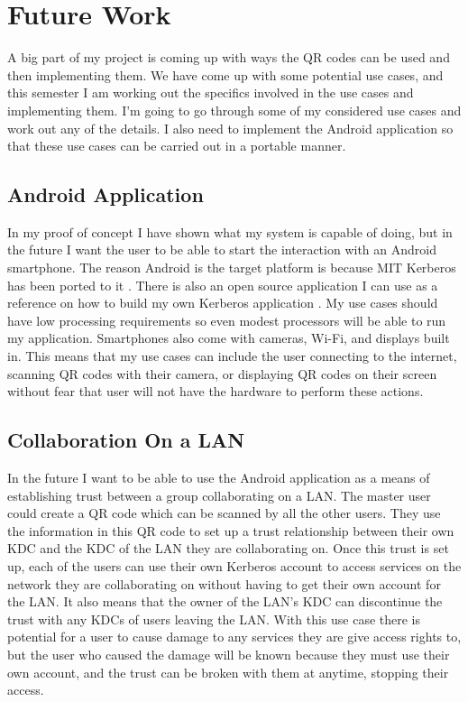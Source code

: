 \documentclass[]{report}   %
\begin{document}
\section{Future Work}
A big part of my project is coming up with ways the QR codes can be used and then implementing them. We have come up with some potential use cases, and this semester I am working out the specifics involved in the use cases and implementing them. I’m going to go through some of my considered use cases and work out any of the details. I also need to implement the Android application so that these use cases can be carried out in a portable manner.

\subsection{Android Application}
In my proof of concept I have shown what my system is capable of doing, but in the future I want the user to be able to start the interaction with an Android smartphone. The reason Android is the target platform is because MIT Kerberos has been ported to it \cite{KerbDroid}. There is also an open source application I can use as a reference on how to build my own Kerberos application \cite{KerbApp}. My use cases should have low processing requirements so even modest processors will be able to run my application. Smartphones also come with cameras, Wi-Fi, and displays built in. This means that my use cases can include the user connecting to the internet, scanning QR codes with their camera, or displaying QR codes on their screen without fear that user will not have the hardware to perform these actions.

\subsection{Collaboration On a LAN}
In the future I want to be able to use the Android application as a means of establishing trust between a group collaborating on a LAN. The master user could create a QR code which can be scanned by all the other users. They use the information in this QR code to set up a trust relationship between their own KDC and the KDC of the LAN they are collaborating on. Once this trust is set up, each of the users can use their own Kerberos account to access services on the network they are collaborating on without having to get their own account for the LAN. It also means that the owner of the LAN’s KDC can discontinue the trust with any KDCs of users leaving the LAN. With this use case there is potential for a user to cause damage to any services they are give access rights to, but the user who caused the damage will be known because they must use their own account, and the trust can be broken with them at anytime, stopping their access.
\end{document}

